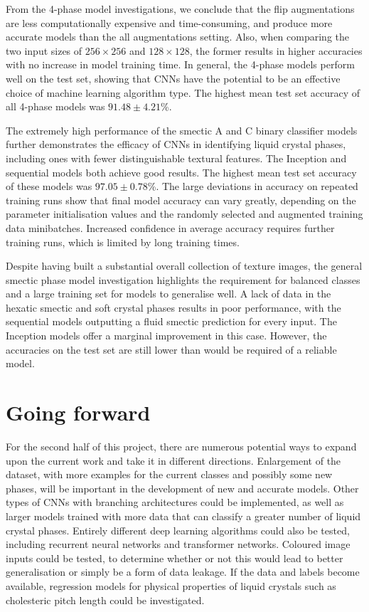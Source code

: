 \documentclass[12pt]{article}
\begin{document}
From the 4-phase model investigations, we conclude that the flip augmentations are less computationally expensive and time-consuming, and produce more accurate models than the all augmentations setting. Also, when comparing the two input sizes of $256 \times 256$ and $128 \times 128$, the former results in higher accuracies with no increase in model training time. In general, the 4-phase models perform well on the test set, showing that CNNs have the potential to be an effective choice of machine learning algorithm type. The highest mean test set accuracy of all 4-phase models was $91.48\pm4.21$\%.

The extremely high performance of the smectic A and C binary classifier models further demonstrates the efficacy of CNNs in identifying liquid crystal phases, including ones with fewer distinguishable textural features. The Inception and sequential models both achieve good results. The highest mean test set accuracy of these models was $97.05\pm0.78$\%. The large deviations in accuracy on repeated training runs show that final model accuracy can vary greatly, depending on the parameter initialisation values and the randomly selected and augmented training data minibatches. Increased confidence in average accuracy requires further training runs, which is limited by long training times.

Despite having built a substantial overall collection of texture images, the general smectic phase model investigation highlights the requirement for balanced classes and a large training set for models to generalise well. A lack of data in the hexatic smectic and soft crystal phases results in poor performance, with the sequential models outputting a fluid smectic prediction for every input. The Inception models offer a marginal improvement in this case. However, the accuracies on the test set are still lower than would be required of a reliable model. 
\section{Going forward}
For the second half of this project, there are numerous potential ways to expand upon the current work and take it in different directions. Enlargement of the dataset, with more examples for the current classes and possibly some new phases, will be important in the development of new and accurate models. Other types of CNNs with branching architectures could be implemented, as well as larger models trained with more data that can classify a greater number of liquid crystal phases. Entirely different deep learning algorithms could also be tested, including recurrent neural networks and transformer networks. Coloured image inputs could be tested, to determine whether or not this would lead to better generalisation or simply be a form of data leakage. If the data and labels become available, regression models for physical properties of liquid crystals such as cholesteric pitch length could be investigated.
\end{document}
